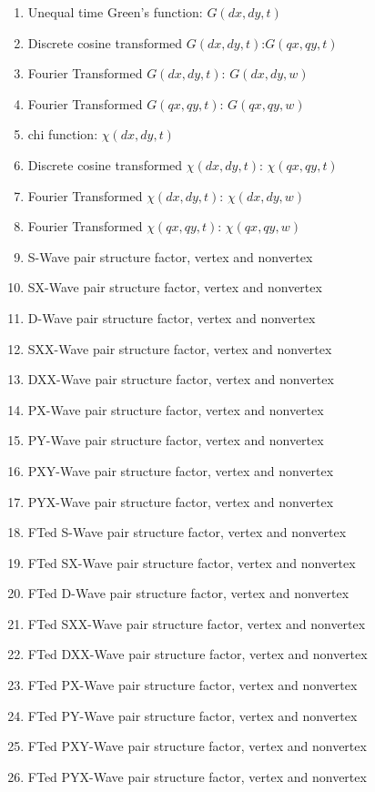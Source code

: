 \documentclass[12pt]{article}
\begin{document}
\begin{enumerate}
   \item Unequal time Green's function: $G(dx,dy,t)$
   \item Discrete cosine transformed  $G(dx,dy,t)$:$G(qx,qy,t)$
   \item Fourier Transformed $G(dx,dy,t)$: $G(dx,dy,w)$
   \item Fourier Transformed $G(qx,qy,t)$: $G(qx,qy,w)$
   \item chi function: $\chi(dx,dy,t)$
   \item Discrete cosine transformed $\chi(dx,dy,t)$: $\chi(qx,qy,t)$
   \item Fourier Transformed $\chi(dx,dy,t)$: $\chi(dx,dy,w)$
   \item Fourier Transformed $\chi(qx,qy,t)$: $\chi(qx,qy,w)$
   \item S-Wave   pair structure factor, vertex and nonvertex
   \item SX-Wave  pair structure factor, vertex and nonvertex
   \item D-Wave   pair structure factor, vertex and nonvertex
   \item SXX-Wave pair structure factor, vertex and nonvertex
   \item DXX-Wave pair structure factor, vertex and nonvertex
   \item PX-Wave  pair structure factor, vertex and nonvertex
   \item PY-Wave  pair structure factor, vertex and nonvertex
   \item PXY-Wave pair structure factor, vertex and nonvertex
   \item PYX-Wave pair structure factor, vertex and nonvertex
   \item FTed S-Wave   pair structure factor, vertex and nonvertex
   \item FTed SX-Wave  pair structure factor, vertex and nonvertex
   \item FTed D-Wave   pair structure factor, vertex and nonvertex
   \item FTed SXX-Wave pair structure factor, vertex and nonvertex
   \item FTed DXX-Wave pair structure factor, vertex and nonvertex
   \item FTed PX-Wave  pair structure factor, vertex and nonvertex
   \item FTed PY-Wave  pair structure factor, vertex and nonvertex
   \item FTed PXY-Wave pair structure factor, vertex and nonvertex
   \item FTed PYX-Wave pair structure factor, vertex and nonvertex
\end{enumerate}
\end{document}
